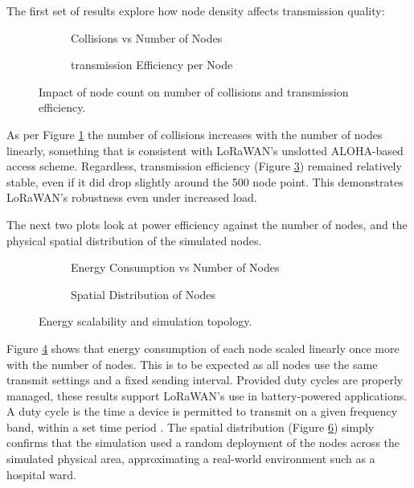 \vspace{1em} \noindent The first set of results explore how node density affects transmission quality:
\begin{figure}[H]
\centering
\begin{subfigure}{0.48\textwidth}
	\centering
	
	\caption{Collisions vs Number of Nodes}
	\label{fig:collisions_vs_nodes}
\end{subfigure}
\hfill
\begin{subfigure}{0.48\textwidth}
	\centering
	
	\caption{transmission Efficiency per Node}
	\label{fig:efficiency_vs_nodes}
\end{subfigure}
\caption{Impact of node count on number of collisions and transmission efficiency.}
\end{figure}

As per Figure \ref{fig:collisions_vs_nodes} the number of collisions increases with the number of nodes linearly, something that is consistent with LoRaWAN's unslotted ALOHA-based access scheme. Regardless, transmission efficiency (Figure \ref{fig:efficiency_vs_nodes}) remained relatively stable, even if it did drop slightly around the 500 node point. This demonstrates LoRaWAN's robustness even under increased load.

\vspace{1em} \noindent The next two plots look at power efficiency against the number of nodes, and the physical spatial distribution of the simulated nodes.

\begin{figure}[H]
\centering
\begin{subfigure}{0.48\textwidth}
	\centering
	
	\caption{Energy Consumption vs Number of Nodes}
	\label{fig:energy_vs_nodes}
\end{subfigure}
\hfill
\begin{subfigure}{0.48\textwidth}
	\centering
	
	\caption{Spatial Distribution of Nodes}
	\label{fig:spatial_distribution}
\end{subfigure}
\caption{Energy scalability and simulation topology.}
\end{figure}

Figure \ref{fig:energy_vs_nodes} shows that energy consumption of each node scaled linearly once more with the number of nodes. This is to be expected as all nodes use the same transmit settings and a fixed sending interval. Provided duty cycles are properly managed, these results support LoRaWAN's use in battery-powered applications. A duty cycle is the time a device is permitted to transmit on a given frequency band, within a set time period \cite{duty_cycles}. The spatial distribution (Figure \ref{fig:spatial_distribution}) simply confirms that the simulation used a random deployment of the nodes across the simulated physical area, approximating a real-world environment such as a hospital ward.

